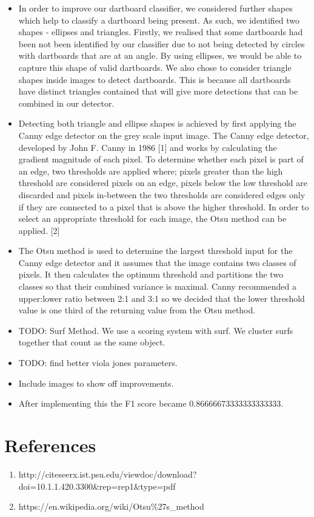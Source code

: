 \documentclass[a4paper]{article}
\begin{document}
\begin{itemize}
\item In order to improve our dartboard classifier, we considered further shapes
which help to classify a dartboard being present.  As such, we identified two
shapes - ellipses and triangles. Firstly, we realised that some dartboards
had been not been identified by our classifier due to not being detected by
circles with dartboards that are at an angle.  By using ellipses, we would
be able to capture this shape of valid dartboards. We also chose to consider
triangle shapes inside images to detect dartboards.  This is because all
dartboards have distinct triangles contained that will give more detections
that can be combined in our detector.

\item Detecting both triangle and ellipse shapes is achieved by first applying the
Canny edge detector on the grey scale input image.  The Canny edge detector,
developed by  John F. Canny in 1986 [1] and works by calculating
the gradient magnitude of each pixel. To determine whether each pixel is part
of an edge, two thresholds are applied where; pixels greater than the high threshold
are considered pixels on an edge, pixels below the low threshold are
discarded and pixels in-between the two thresholds are considered edges only if
they are connected to a pixel that is above the higher threshold. In order to
select an appropriate threshold for each image, the Otsu method can be applied.
[2]

\item The Otsu method is used to determine the largest threshold input for the Canny
edge detector and it assumes that the image contains two classes of pixels. It then calculates the optimum threshold and partitions the two classes so that their combined 
variance is maximal. Canny recommended a upper:lower ratio between 2:1 and 3:1 so we decided that the lower threshold value is one third of the returning value from the Otsu method. 

\item TODO: Surf Method. We use a scoring system with surf. We cluster surfs together that count as the same object.

\item TODO: find better viola jones parameters.

\item Include images to show off improvements.

\item After implementing this the F1 score became 0.86666673333333333333.

\end{itemize}

\section*{References}

\begin{enumerate}
\item http://citeseerx.ist.psu.edu/viewdoc/download?doi=10.1.1.420.3300\&rep=rep1\&type=pdf
\item https://en.wikipedia.org/wiki/Otsu\%27s\_method
\end{enumerate}

\vspace{-4em}
\end{document}
